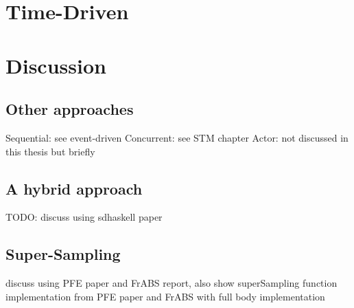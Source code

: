 \section{Time-Driven}

\section{Discussion}

\subsection{Other approaches}
Sequential: see event-driven
Concurrent: see STM chapter
Actor: not discussed in this thesis but briefly 

\subsection{A hybrid approach}
TODO: discuss using sdhaskell paper

\subsection{Super-Sampling}
discuss using PFE paper and FrABS report, also show superSampling function implementation from PFE paper and FrABS with full body implementation
